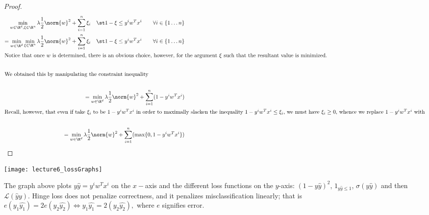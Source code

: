 \documentclass[../main.tex]{subfiles}
\begin{document}
\begin{proof}

    \begin{align*}
        \min_{w \in \R^d, \xi \in \R^n} \lambda\frac{1}{2}\norm{w}^2 + \sum_{i=1}^{n}\xi_{i} \quad \st 1 - \xi \leq y^{i}w^Tx^{i} \qquad \forall i \in \{1 \dots n\} \\
        = \min_{w \in \R^d} \min_{\xi \in \R^n} \lambda\frac{1}{2}\norm{w}^2 + \sum_{i=1}^{n}\xi_{i} \quad \st 1 - \xi \leq y^{i}w^Tx^{i} \qquad \forall i \in \{1 \dots n\} \\
        \intertext{Notice that once $w$ is determined, there is an obvious choice, however,
        for the argument $\xi$ such that the resultant value is minimized.} \\
        \intertext{We obtained this by manipulating the constraint inequality} \\
        = \min_{w \in \R^d} \lambda\frac{1}{2}\norm{w}^2 + \sum_{i=1}^{n}(1 - y^{i}w^Tx^{i})  \\
        \intertext{Recall, however, that even if take $\xi_{i}$ to be $1 - y^{i}w^Tx^{i}$ in order to maximally slacken the inequality $1  - y^{i}w^Tx^{i} \leq \xi_{i}$, we must have $\xi_{i} \geq 0$, whence we replace $1 - y^{i}w^Tx^{i}$ with} \\
        = \min_{w \in \R^d} \lambda\frac{1}{2}\norm{w}^2 + \sum_{i=1}^{n}(\max\{0,1 - y^{i}w^Tx^{i}\})  \\
    \end{align*}
    
\end{proof}

\begin{remark}
    \begin{center}
        \texttt{[image: lecture6\_lossGraphs]}
    \end{center}

    The graph above plots $y\hat{y} = y^{i}w^Tx^{i}$ on the $x-$axis and the different loss functions on the $y$-axis: $(1 - y\hat{y})^2$, $1_{y\hat{y} \leq 1}$, $\sigma(y\hat{y})$ and then $\mathcal{L}(\hat{y}y)$. Hinge loss does not penalize correctness, and it penalizes misclassification linearly; that is $e(y_{1}\hat{y_{1}}) = 2e(y_{2}\hat{y_{2}}) \iff y_{1}\hat{y_{1}} = 2(y_{2}\hat{y_{2}}),$ where $e$ signifies error.
\end{remark}
\end{document}
